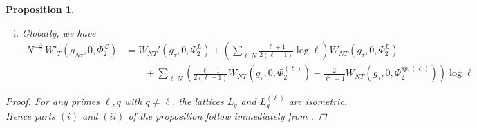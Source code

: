 \documentclass[reqno,oneside]{amsart}
\theoremstyle{plain}
\newtheorem{proposition}[theorem]{Proposition}
\theoremstyle{remark}
\numberwithin{theorem}{section}
\newcommand{\calL}{\mathcal L}
\begin{document}
\begin{proposition}
\begin{enumerate}[(i)]
			\item  Globally, we have
			\begin{align*}
			N^{-\frac32} \,	W'_T(g_{N\tau}, 0, \Phi^{\calL}_2)  &= W_{NT}'(g_{\tau}, 0, \Phi^L_2) + \left( \sum_{\ell|N}  \frac{\ell + 1}{2(\ell - 1)} \log \ell \right) W_{NT}(g_{\tau}, 0, \Phi^L_2)  \\
			& \qquad + \sum_{\ell|N} \left(  \frac{\ell-1}{2(\ell+1)} W_{NT}(g_{\tau}, 0, \Phi_2^{(\ell)}) - \frac{2}{ \ell^2-1} W_{NT}(g_{\tau}, 0, \Phi^{sp,(\ell)}_2)	\right) \log \ell	\end{align*}
		\end{enumerate}
		\begin{proof}
			For any primes $\ell, q$ with $q \neq \ell$, the lattices $L_q$ and $L^{(\ell)}_q$ are isometric. Hence parts $(i)$ and $(ii)$ of the proposition follow immediately from .
			

\end{proof}
\end{proposition}
\end{document}
